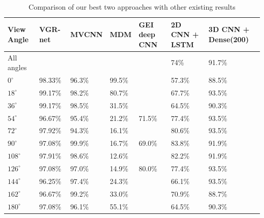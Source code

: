 \documentclass[12pt]{article}
\theoremstyle{definition}
\begin{document}
	\begin{table}[h]
		\centering
		\renewcommand{\arraystretch}{1.5}

		\caption{Comparison of our best two approaches with other existing results}
		\label{table:camparison-results}

		\begin{tabularx}{\textwidth}{X|X|X|X|X|X|X}
			\textbf{View Angle} & \textbf{VGR-net \cite{VGR-Net}} & \textbf{MVCNN \cite{Wolf2016MultiviewGR}} & \textbf{MDM \cite{gait-with-curvature-map}} & \textbf{GEI deep CNN \cite{gait-with-gei}} & \textbf{2D CNN + LSTM} & \textbf{3D CNN + Dense(200)}\\ \hline
			All angles  & \textbf{\textendash} & \textbf{\textendash} & \textbf{\textendash} & \textbf{\textendash} & 74\%   & 91.7\% \\ \hline
			$0^\circ$   & 98.33\%              & 96.3\%               & 99.5\%               & \textbf{\textendash} & 57.3\% & 88.5\% \\ \hline
			$18^\circ$  & 99.17\%              & 98.2\%               & 80.7\%               & \textbf{\textendash} & 67.7\% & 93.5\% \\ \hline
			$36^\circ$  & 99.17\%              & 98.5\%               & 31.5\%               & \textbf{\textendash} & 64.5\% & 90.3\% \\ \hline
			$54^\circ$  & 96.67\%              & 95.4\%               & 21.2\%               & 71.5\%               & 77.4\% & 93.5\% \\ \hline
			$72^\circ$  & 97.92\%              & 94.3\%               & 16.1\%               & \textbf{\textendash} & 80.6\% & 93.5\% \\ \hline
			$90^\circ$  & 97.08\%              & 99.9\%               & 16.7\%               & 69.0\%               & 83.8\% & 91.9\% \\ \hline
			$108^\circ$ & 97.91\%              & 98.6\%               & 12.6\%               & \textbf{\textendash} & 82.2\% & 91.9\% \\ \hline
			$126^\circ$ & 97.08\%              & 97.0\%               & 14.9\%               & 80.0\%               & 77.4\% & 93.5\% \\ \hline
			$144^\circ$ & 96.25\%              & 97.4\%               & 24.3\%               & \textbf{\textendash} & 66.1\% & 93.5\% \\ \hline
			$162^\circ$ & 96.67\%              & 99.2\%               & 33.0\%               & \textbf{\textendash} & 70.9\% & 88.7\% \\ \hline
			$180^\circ$ & 97.08\%              & 96.1\%               & 55.1\%               & \textbf{\textendash} & 64.5\% & 90.3\% \\
		\end{tabularx}
	\end{table}
\end{document}
